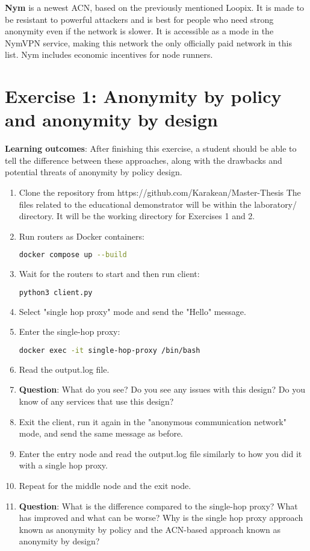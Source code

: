 \textbf{Nym} is a newest ACN, based on the previously mentioned Loopix. It is made to be resistant to powerful attackers and is best for people who need strong anonymity even if the network is slower. It is accessible as a mode in the NymVPN service, making this network the only officially paid network in this list. Nym includes economic incentives for node runners.

\section*{Exercise 1: Anonymity by policy and anonymity by design}
\textbf{Learning outcomes}: After finishing this exercise, a student should be able to tell the difference between these approaches, along with the drawbacks and potential threats of anonymity by policy design.
\begin{enumerate}
    \item Clone the repository from https://github.com/Karakean/Master-Thesis
    The files related to the educational demonstrator will be within the laboratory/ directory. It will be the working directory for Exercises 1 and 2.
    \item Run routers as Docker containers:
    \begin{lstlisting}[language=bash]
    docker compose up --build
    \end{lstlisting}
    \item Wait for the routers to start and then run client:
    \begin{lstlisting}[language=bash]
    python3 client.py
    \end{lstlisting}
    \item Select "single hop proxy" mode and send the "Hello" message.
    \item Enter the single-hop proxy:
    \begin{lstlisting}[language=bash]
    docker exec -it single-hop-proxy /bin/bash
    \end{lstlisting}
    \item Read the output.log file.
    \item \textbf{Question}: What do you see? Do you see any issues with this design? Do you know of any services that use this design?
    \item Exit the client, run it again in the "anonymous communication network" mode, and send the same message as before.
    \item Enter the entry node and read the output.log file similarly to how you did it with a single hop proxy.
    \item Repeat for the middle node and the exit node.
    \item \textbf{Question}: What is the difference compared to the single-hop proxy? What has improved and what can be worse? Why is the single hop proxy approach known as anonymity by policy and the ACN-based approach known as anonymity by design?
\end{enumerate}

